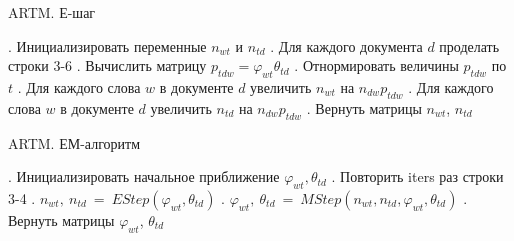 \documentclass[12pt]{article}
\newenvironment{rusalgorithm}[1][htb]
  {\renewcommand{\algorithmcfname}{Алгоритм}
   \begin{algorithm}[#1]
  }{\end{algorithm}}
\renewcommand{\phi}{\varphi}
\begin{document}
\begin{rusalgorithm}[H]
\caption{ARTM. Е-шаг}\label{malgo4}
\begin{algorithmic}[]
\Procedure{EStep}{$\phi_{wt}, \theta_{td}$}
. Инициализировать переменные $n_{wt}$ и $n_{td}$
. Для каждого документа $d$ проделать строки 3-6
. Вычислить матрицу $p_{tdw} = \phi_{wt} \theta_{td}$
. Отнормировать величины $p_{tdw}$ по $t$
. Для каждого слова $w$ в документе $d$ увеличить $n_{wt}$ на $n_{dw}p_{tdw}$
. Для каждого слова $w$ в документе $d$ увеличить $n_{td}$ на $n_{dw}p_{tdw}$
. Вернуть матрицы $n_{wt}$, $n_{td}$
\EndProcedure
\end{algorithmic}
\end{rusalgorithm}

\begin{rusalgorithm}[H]
\caption{ARTM. ЕМ-алгоритм}\label{malgo5}
\begin{algorithmic}[]
. Инициализировать начальное приближение $\phi_{wt}, \theta_{td}$
. Повторить iters раз строки 3-4
. $n_{wt},~n_{td}~=~EStep(\phi_{wt}, \theta_{td})$
. $\phi_{wt},~\theta_{td}~=~MStep(n_{wt},n_{td},\phi_{wt}, \theta_{td})$
. Вернуть матрицы $\phi_{wt}$, $\theta_{td}$
\EndProcedure
\end{algorithmic}
\end{rusalgorithm}
\end{document}
